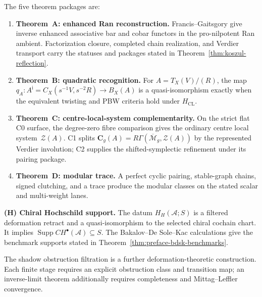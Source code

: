 \documentclass[11pt]{memoir}
\newcommand{\cA}{\mathcal{A}}
\newcommand{\ChirHoch}{CH} %
\begin{document}
The five theorem packages are:

\begin{enumerate}[label=\textbf{(\Alph*)},leftmargin=2.2em]
\item \textbf{Theorem~A: enhanced Ran reconstruction.}
 Francis--Gaitsgory give inverse enhanced associative bar and cobar
 functors in the pro-nilpotent Ran ambient.  Factorization closure,
 completed chain realization, and Verdier transport carry the
 statuses and packages stated in
 Theorem~\ref{thm:koszul-reflection}.
\item \textbf{Theorem~B: quadratic recognition.}
 For $A=T_X(V)/(R)$, the map
 $q_A\colon A^{\mathrm i}=C_X(s^{-1}V,s^{-2}R)\to B_X(A)$ is a
 quasi-isomorphism exactly when the equivalent twisting and PBW
 criteria hold under $H_{\mathrm{CL}}$.
\item \textbf{Theorem~C: centre-local-system complementarity.}
 On the strict flat C0 surface, the degree-zero fibre comparison gives
 the ordinary centre local system~$\mathcal Z(A)$.  C1 splits
 $\mathbf C_g(A)=R\Gamma(\overline{\mathcal M}_g,\mathcal Z(A))$
 by the represented Verdier involution; C2 supplies the
 shifted-symplectic refinement under its pairing package.
\item \textbf{Theorem~D: modular trace.}
 A perfect cyclic pairing, stable-graph chains, signed clutching, and
 a trace produce the modular classes on the stated scalar and
 multi-weight lanes.
\end{enumerate}
\noindent
\textbf{(H) Chiral Hochschild support.}
The datum $H_H(\cA;S)$ is a filtered deformation retract and a
quasi-isomorphism to the selected chiral cochain chart.  It implies
$\operatorname{Supp}\ChirHoch^\bullet(\cA)\subseteq S$.  The
Bakalov--De Sole--Kac calculations give the benchmark supports stated
in Theorem~\ref{thm:preface-bdsk-benchmarks}.

\smallskip\noindent
The shadow obstruction filtration is a further deformation-theoretic
construction.  Each finite stage requires an explicit obstruction
class and transition map; an inverse-limit theorem additionally
requires completeness and Mittag--Leffler convergence.

\ifannalsedition\else

\fi


\end{document}
